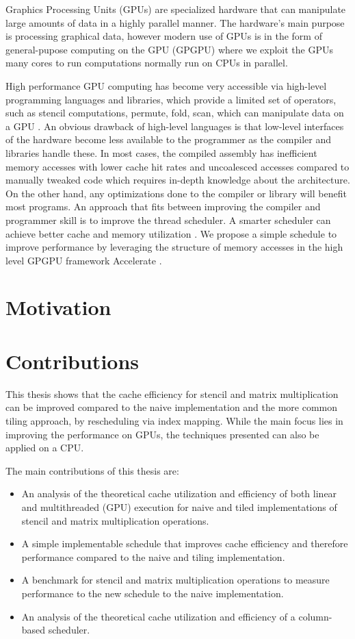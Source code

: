 Graphics Processing Units (GPUs) are specialized hardware that can manipulate large amounts of data in a highly parallel manner.
The hardware's main purpose is processing graphical data, however modern use of GPUs is in the form of general-pupose computing on the GPU (GPGPU) where we exploit the GPUs many cores to run computations normally run on CPUs in parallel.

High performance GPU computing has become very accessible via high-level programming languages and libraries, which provide a limited set of operators, such as stencil computations, permute, fold, scan, which can manipulate data on a GPU \cite{chakravarty2011accelerating}.
An obvious drawback of high-level languages is that low-level interfaces of the hardware become less available to the programmer as the compiler and libraries handle these.
In most cases, the compiled assembly has inefficient memory accesses with lower cache hit rates and uncoalesced accesses compared to manually tweaked code which requires in-depth knowledge about the architecture.
On the other hand, any optimizations done to the compiler or library will benefit most programs.
An approach that fits between improving the compiler and programmer skill is to improve the thread scheduler.
A smarter scheduler can achieve better cache and memory utilization \cite{nugteren2014study}.
We propose a simple schedule to improve performance by leveraging the structure of memory accesses in the high level GPGPU framework Accelerate \cite{chakravarty2011accelerating}.

\section{Motivation}

\section{Contributions}
This thesis shows that the cache efficiency for stencil and matrix multiplication can be improved compared to the naive implementation and the more common tiling approach, by rescheduling via index mapping.
While the main focus lies in improving the performance on GPUs, the techniques presented can also be applied on a CPU.

\vspace{1em}
The main contributions of this thesis are:
\begin{itemize}
    \item An analysis of the theoretical cache utilization and efficiency of both linear and multithreaded (GPU) execution for naive and tiled implementations of stencil and matrix multiplication operations.
    \item A simple implementable schedule that improves cache efficiency and therefore performance compared to the naive and tiling implementation.
    \item A benchmark for stencil and matrix multiplication operations to measure performance to the new schedule to the naive implementation.
    \item An analysis of the theoretical cache utilization and efficiency of a column-based scheduler.
\end{itemize}

